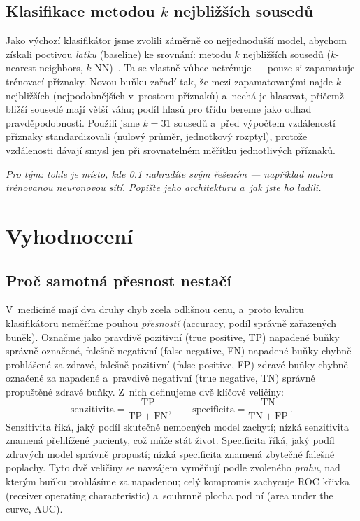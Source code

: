 \documentclass[11pt]{article}
\newcommand{\knnK}{31}
\begin{document}
\subsection{Klasifikace metodou $k$ nejbližších sousedů}
\label{sec:knn}

Jako výchozí klasifikátor jsme zvolili záměrně co nejjednodušší model, abychom získali
poctivou \emph{laťku} (baseline) ke srovnání: metodu $k$ nejbližších sousedů ($k$-nearest
neighbors, $k$-NN)~\cite{cover1967}. Ta se vlastně vůbec netrénuje --- pouze si zapamatuje
trénovací příznaky. Novou buňku zařadí tak, že mezi zapamatovanými najde $k$ nejbližších
(nejpodobnějších v~prostoru příznaků) a~nechá je hlasovat, přičemž bližší sousedé mají větší
váhu; podíl hlasů pro třídu  bereme jako odhad pravděpodobnosti. Použili jsme
$k=\knnK{}$ sousedů a~před výpočtem vzdáleností příznaky standardizovali (nulový průměr,
jednotkový rozptyl), protože vzdálenosti dávají smysl jen při srovnatelném měřítku jednotlivých
příznaků.

\medskip\noindent\textit{Pro tým: tohle je místo, kde \cref{sec:knn} nahradíte svým řešením
--- například malou trénovanou neuronovou sítí. Popište jeho architekturu a~jak jste ho ladili.}

\section{Vyhodnocení}
\label{sec:vyhodnoceni}

\subsection{Proč samotná přesnost nestačí}
\label{sec:metriky}

V~medicíně mají dva druhy chyb zcela odlišnou cenu, a~proto kvalitu klasifikátoru neměříme
pouhou \emph{přesností} (accuracy, podíl správně zařazených buněk). Označme jako pravdivě
pozitivní (true positive, TP) napadené buňky správně označené, falešně negativní (false
negative, FN) napadené buňky chybně prohlášené za zdravé, falešně pozitivní (false positive,
FP) zdravé buňky chybně označené za napadené a~pravdivě negativní (true negative, TN) správně
propuštěné zdravé buňky. Z~nich definujeme dvě klíčové veličiny:
%
\begin{equation}
\mathrm{senzitivita} = \frac{\mathrm{TP}}{\mathrm{TP}+\mathrm{FN}}, \qquad
\mathrm{specificita} = \frac{\mathrm{TN}}{\mathrm{TN}+\mathrm{FP}}\,.
\label{eq:senzspec}
\end{equation}
%
Senzitivita říká, jaký podíl skutečně nemocných model zachytí; nízká senzitivita znamená
přehlížené pacienty, což může stát život. Specificita říká, jaký podíl zdravých model správně
propustí; nízká specificita znamená zbytečné falešné poplachy. Tyto dvě veličiny se navzájem
vyměňují podle zvoleného \emph{prahu}, nad kterým buňku prohlásíme za napadenou; celý
kompromis zachycuje ROC křivka (receiver operating characteristic) a~souhrnně plocha pod
ní (area under the curve, AUC).
\end{document}
